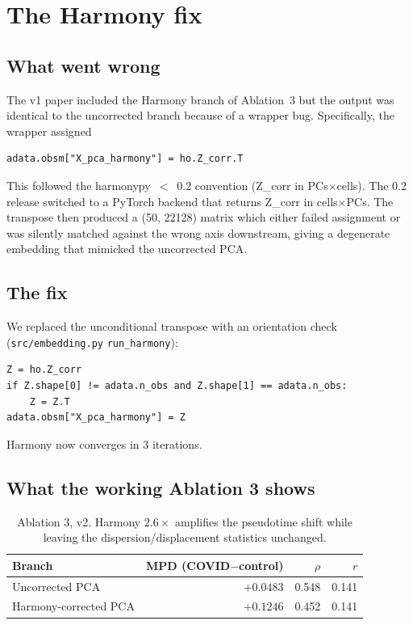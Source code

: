 \documentclass[11pt]{article}
\begin{document}
\section{The Harmony fix}\label{sec:harmony-fix}

\subsection{What went wrong}

The v1 paper included the Harmony branch of Ablation~3 but the output was identical to
the uncorrected branch because of a wrapper bug. Specifically, the wrapper assigned

\begin{verbatim}
adata.obsm["X_pca_harmony"] = ho.Z_corr.T
\end{verbatim}

This followed the harmonypy~$<$~0.2 convention (Z\_corr in PCs$\times$cells). The 0.2
release switched to a PyTorch backend that returns Z\_corr in cells$\times$PCs.
The transpose then produced a (50, 22128) matrix which either failed assignment or was
silently matched against the wrong axis downstream, giving a degenerate embedding that
mimicked the uncorrected PCA.

\subsection{The fix}

We replaced the unconditional transpose with an orientation check
(\texttt{src/embedding.py} \texttt{run\_harmony}):

\begin{verbatim}
Z = ho.Z_corr
if Z.shape[0] != adata.n_obs and Z.shape[1] == adata.n_obs:
    Z = Z.T
adata.obsm["X_pca_harmony"] = Z
\end{verbatim}

Harmony now converges in 3 iterations.

\subsection{What the working Ablation 3 shows}

\begin{table}[H]
\centering
\begin{tabular}{lrrr}
\toprule
Branch & MPD (COVID$-$control) & $\rho$ & $r$ \\
\midrule
Uncorrected PCA & $+0.0483$ & 0.548 & 0.141 \\
Harmony-corrected PCA & $+0.1246$ & 0.452 & 0.141 \\
\bottomrule
\end{tabular}
\caption{Ablation 3, v2. Harmony $2.6\times$ amplifies the pseudotime shift while
leaving the dispersion/displacement statistics unchanged.}
\end{table}
\end{document}
